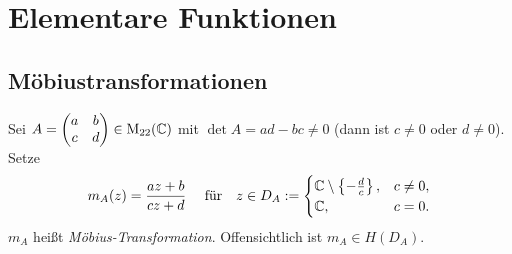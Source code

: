 \documentclass[a4paper,twoside,DIV15,BCOR12mm]{scrbook}
\begin{document}
\section{Elementare Funktionen}

\subsection{Möbiustransformationen}

\noindent Sei $A = \left(\!\!\!\begin{array}{c c}a&b\\c&d\end{array}\!\!\!\right) \in \mathrm{M}_{22}(\mathbb{C})$ mit $\det A = ad-bc \neq 0$ (dann ist $c\neq0$ oder
$d\neq0$). Setze
\[m_A(z) = \frac{az+b}{cz+d} \quad \  \text{für} \quad z \in D_A :=
\begin{cases} \mathbb{C} \setminus \left\{-\frac{d}{c}\right\} ,& c \neq 0, \\ \mathbb{C} ,& c = 0. \end{cases}\]
$m_A$ heißt \emph{Möbius-Transformation}. Offensichtlich ist $m_A \in H(D_A)$.
\end{document}
